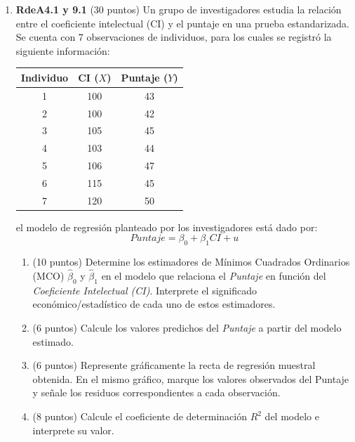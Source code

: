 \documentclass[10pt,a4paper]{article}
\begin{document}
\begin{enumerate}


\item \textbf{RdeA4.1 y 9.1} (30 puntos) Un grupo de investigadores estudia la relación entre el coeficiente intelectual (CI) y el puntaje en una prueba estandarizada. Se cuenta con 7 observaciones de individuos, para los cuales se registró la siguiente información:

\begin{center}
\begin{tabular}{|c|c|c|}
\hline
\textbf{Individuo} & \textbf{CI} ($X$) & \textbf{Puntaje} ($Y$)\\
\hline
1 & 100  & 43 \\
2 & 100 & 42 \\
3 & 105 & 45 \\
4 & 103 & 44 \\
5 & 106 & 47 \\
6 & 115 & 45 \\
7 & 120 & 50 \\
\hline
\end{tabular}
\end{center}

el modelo de regresión planteado por los investigadores está dado por:
$$Puntaje = \beta_0 + \beta_1 CI + u$$

\begin{enumerate}
      \item (10 puntos) Determine los estimadores de Mínimos Cuadrados Ordinarios (MCO) 
$\hat{\beta}_0$ y $\hat{\beta}_1$ en el modelo que relaciona el 
\textit{Puntaje} en función del \textit{Coeficiente Intelectual (CI)}. 
Interprete el significado económico/estadístico de cada uno de estos estimadores.





    \item (6 puntos) Calcule los valores predichos del \textit{Puntaje} a partir del modelo estimado.

\item (6 puntos) Represente gráficamente la {recta de regresión muestral} obtenida. 
En el mismo gráfico, marque los valores observados del {Puntaje} 
y señale los {residuos} correspondientes a cada observación.


    \item (8 puntos) Calcule el coeficiente de determinación $R^2$ del modelo e interprete su valor.
  
   
\end{enumerate}
\end{enumerate}
\end{document}
